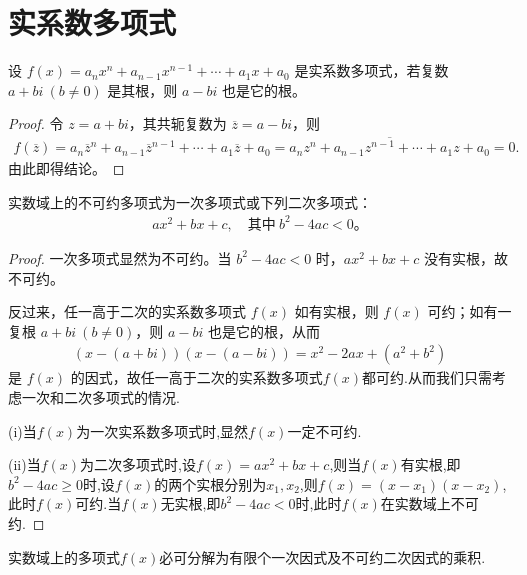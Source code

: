 \documentclass[../../main.tex]{subfiles}
\begin{document}
\section{实系数多项式}

\begin{theorem}[实系数多项式的复根成对出现]\label{theorem:实系数多项式的复根成对出现}
设 $f(x) = a_n x^n + a_{n-1} x^{n-1} + \cdots + a_1 x + a_0$ 是实系数多项式，若复数 $a + bi \ (b \neq 0)$ 是其根，则 $a - bi$ 也是它的根。
\end{theorem}
\begin{proof}
令 $z = a + bi$，其共轭复数为 $\overline{z} = a - bi$，则
\begin{align*}
f(\overline{z})=a_n\overline{z}^n+a_{n-1}\overline{z}^{n-1}+\cdots +a_1\overline{z}+a_0=\overline{a_nz^n+a_{n-1}z^{n-1}+\cdots +a_1z+a_0}=0.
\end{align*}
由此即得结论。

\end{proof}

\begin{corollary}
实数域上的不可约多项式为一次多项式或下列二次多项式：
\begin{align*}
ax^2 + bx + c, \quad \text{其中} \ b^2 - 4ac < 0。
\end{align*}
\end{corollary}
\begin{proof}
一次多项式显然为不可约。当 $b^2 - 4ac < 0$ 时，$ax^2 + bx + c$ 没有实根，故不可约。

反过来，任一高于二次的实系数多项式 $f(x)$ 如有实根，则 $f(x)$ 可约；如有一复根 $a + bi \ (b \neq 0)$，则 $a - bi$ 也是它的根，从而
\begin{align*}
(x - (a + bi))(x - (a - bi)) = x^2 - 2ax + (a^2 + b^2)
\end{align*}
是 $f(x)$ 的因式，故任一高于二次的实系数多项式$f(x)$都可约.从而我们只需考虑一次和二次多项式的情况.

(i)当$f(x)$为一次实系数多项式时,显然$f(x)$一定不可约.

(ii)当$f(x)$为二次多项式时,设$f(x)=ax^2+bx+c$,则当$f(x)$有实根,即$b^2-4ac\geqslant  0$时,设$f(x)$的两个实根分别为$x_1,x_2$,则$f(x)=(x-x_1)(x-x_2)$,此时$f(x)$可约.当$f(x)$无实根,即$b^2-4ac<0$时,此时$f(x)$在实数域上不可约.

\end{proof}

\begin{corollary}
实数域上的多项式$f(x)$必可分解为有限个一次因式及不可约二次因式的乘积.
\end{corollary}
\end{document}
